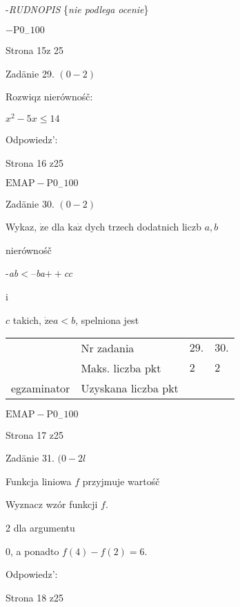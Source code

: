 \documentclass[a4paper,12pt]{article}
\begin{document}
-{\it RUDNOPIS} \{{\it nie podlega ocenie}\}

$-\mathrm{P}0_{-}100$

Strona 15z 25





Zadänie 29. $(0-2)$

Rozwiqz nierównośč:

$x^{2}-5x\leq 14$

Odpowiedz':

Strona 16 z25

$\mathrm{E}\mathrm{M}\mathrm{A}\mathrm{P}-\mathrm{P}0_{-}100$





Zadänie 30. $(0-2)$

Wykaz, $\dot{\mathrm{z}}\mathrm{e}$ dla $\mathrm{k}\mathrm{a}\dot{\mathrm{z}}$ dych trzech dodatnich liczb $a, b$

nierównośč

-{\it ab}$<$--{\it ba}$++${\it cc}

i

$c$ takich, $\dot{\mathrm{z}}\mathrm{e} a<b$, spelniona jest
\begin{center}
\begin{tabular}{|l|l|l|l|}
\cline{2-4}
&	\multicolumn{1}{|l|}{Nr zadania}&	\multicolumn{1}{|l|}{$29.$}&	\multicolumn{1}{|l|}{ $30.$}	\\
\cline{2-4}
&	\multicolumn{1}{|l|}{Maks. liczba pkt}&	\multicolumn{1}{|l|}{$2$}&	\multicolumn{1}{|l|}{ $2$}	\\
\cline{2-4}
\multicolumn{1}{|l|}{egzaminator}&	\multicolumn{1}{|l|}{Uzyskana liczba pkt}&	\multicolumn{1}{|l|}{}&	\multicolumn{1}{|l|}{}	\\
\hline
\end{tabular}

\end{center}
$\mathrm{E}\mathrm{M}\mathrm{A}\mathrm{P}-\mathrm{P}0_{-}100$

Strona 17 z25





Zadänie 31. $(0-2l$

Funkcja liniowa $f$ przyjmuje wartośč

Wyznacz wzór funkcji $f.$

2 dla argumentu

0, a ponadto $f(4)-f(2)=6.$

Odpowiedz':

Strona 18 z25
\end{document}
